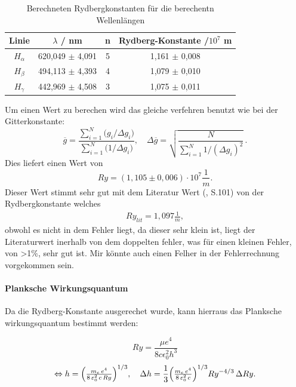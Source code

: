 \begin{table}[htbp]
    \centering
    \begin{tabular}{|c|c|c|c|}
        Linie & $\lambda$ / nm & n & Rydberg-Konstante /$10^7$ m \\
        \hline
        $H_\alpha$ & 620,049 $\pm$ 4,091 & 5 & 1,161 $\pm$ 0,008 \\
        $H_\beta$ & 494,113 $\pm$ 4,393 & 4 & 1,079 $\pm$ 0,010  \\
        $H_\gamma$ & 442,969 $\pm$ 4,508 & 3 & 1,075 $\pm$ 0,011 \\
    \end{tabular}
    \caption{Berechneten Rydbergkonstanten für die berechentn Wellenlängen}
    \label{tab:Rydberg}
\end{table}

Um einen Wert zu berechen wird das gleiche verfehren benutzt wie bei der Gitterkonstante:
\begin{equation}
  \overline{g}
  = \frac{\sum_{i=1}^{N} \bigl(g_i/\Delta g_i\bigr)}
         {\sum_{i=1}^{N} \bigl(1/\Delta g_i\bigr)},
  \quad
  \Delta\overline{g}
  = \sqrt{\frac{N}{\sum_{i=1}^{N} 1/(\Delta g_i)^{2}}}\,.
\end{equation}
Dies liefert einen Wert von 
\begin{equation}
    Ry = (1,105 \pm 0,006)\cdot 10^7 \frac{1}{m}.
\end{equation}
Dieser Wert stimmt sehr gut mit dem Literatur Wert (\cite{Demtröder_Ex3}, S.101) von der Rydbergkonstante welches 
\begin{align}
    Ry_{lit} = 1,097 \frac{1}{m},
\end{align}
obwohl es nicht in dem Fehler liegt, da dieser sehr klein ist, liegt der Literaturwert inerhalb von dem doppelten fehler, was für einen kleinen Fehler, von >1$\%$, sehr gut ist.
Mir könnte auch einen Felher in der Fehlerrechnung vorgekommen sein.

\paragraph{Planksche Wirkungsquantum}

Da die Rydberg-Konstante ausgerechet wurde, kann hierraus das Planksche wirkungsquantum bestimmt werden:

\begin{equation}
    Ry = \frac{\mu e^4}{8 c \epsilon_0^2h^3}
\end{equation}
\begin{equation}
  \Leftrightarrow h
  = \Bigl(\tfrac{m_e\,e^{4}}{8\,\varepsilon_{0}^{2}\,c\,Ry}\Bigr)^{1/3},
  \quad
  \Delta h
  = \frac{1}{3}
    \Bigl(\tfrac{m_e\,e^{4}}{8\,\varepsilon_{0}^{2}\,c}\Bigr)^{1/3}
    Ry^{-4/3}\,\Delta Ry.
\end{equation}

